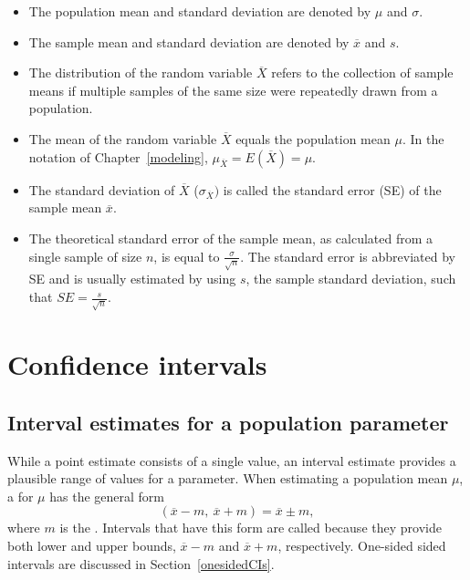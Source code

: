 \begin{termBox}{
\begin{itemize}
	\setlength{\itemsep}{0mm}	
	\item The population mean and standard deviation are denoted by $\mu$ and $\sigma$. 
	
	\item The sample mean and standard deviation are denoted by $\overline{x}$ and $s$. 
	
	\item The distribution of the random variable $\overline{X}$ refers to the collection of sample means if multiple samples of the same size were repeatedly drawn from a population. 
	
	\item The mean of the random variable $\overline{X}$ equals the population mean $\mu$.  In the notation of Chapter~\ref{modeling}, $\mu_{\overline{X}} = E(\overline{X}) = \mu$.
	
	\item  The standard deviation of $\overline{X}$ ($\sigma_{\overline{X}})$ is called the standard error (SE) of the sample mean $\overline{x}$. 
	
	\item The theoretical standard error of the sample mean, as calculated from a single sample of size $n$, is equal to $\frac{\sigma}{\sqrt{n}}$. The standard error is abbreviated by SE and is usually estimated by using $s$, the sample standard deviation, such that $SE = \frac{s}{\sqrt{n}}$.
	
\end{itemize}
	}
\end{termBox}


\section[Confidence intervals]{Confidence intervals}
\label{confidenceIntervals}
\subsection{Interval estimates for a population parameter}

While a point estimate consists of a single value, an interval estimate provides a plausible range of values for a parameter. When estimating a population mean $\mu$, a  for $\mu$ has the general form
\[(\overline{x} -m, \ \overline{x} + m) = \overline{x} \pm m, \]
where $m$ is the . Intervals that have this form are called  because they provide both lower and upper bounds, $\overline{x} - m$ and $\overline{x} + m$, respectively. One-sided sided intervals are discussed in Section~\ref{onesidedCIs}.

